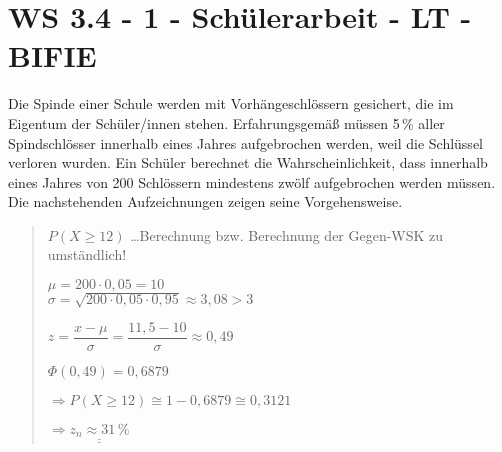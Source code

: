 \section{WS 3.4 - 1 - Schülerarbeit - LT - BIFIE}

\begin{beispiel}[WS 3.4]{1} %
Die Spinde einer Schule werden mit Vorhängeschlössern gesichert, die im Eigentum der Schüler/innen stehen. Erfahrungsgemäß müssen 5\,\% aller Spindschlösser innerhalb eines Jahres
aufgebrochen werden, weil die Schlüssel verloren wurden. Ein Schüler berechnet die Wahrscheinlichkeit, dass innerhalb eines Jahres von 200 Schlössern mindestens zwölf aufgebrochen
werden müssen. Die nachstehenden Aufzeichnungen zeigen seine Vorgehensweise. 

\begin{quote}
\footnotesize
\color[rgb]{0.3,0.3,0.3}
$P(X\geq12)$ \ldots Berechnung bzw. Berechnung der Gegen-WSK zu umständlich!

$\mu= 200\cdot 0,05 =10$ \\
$\sigma=\sqrt{200 \cdot 0,05\cdot 0,95} \approx 3,08 > 3$ \checkmark \leer

$z=\dfrac{x - \mu}{\sigma}=\dfrac{11,5 - 10}{\sigma} \approx 0,49$ \leer

$\Phi(0,49) = 0,6879$

$\Rightarrow P(X\geq 12)\cong 1 - 0,6879 \cong 0,3121$

$\Rightarrow \underline{\underline{z_n \approx 31\,\%}}$

\end{quote}
\color[rgb]{0,0,0} \vspace{-0.7cm}\leer

\normalsize
{}



\end{beispiel}